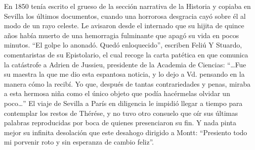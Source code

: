 \documentclass[10pt,twoside,openright]{memoir}
\begin{document}
En 1850 tenía escrito el grueso de la sección narrativa de la Historia y
copiaba en Sevilla los últimos documentos, cuando una horrorosa
desgracia cayó sobre él al modo de un rayo celeste. Le avisaron desde el
internado que su hijita de quince años había muerto de una hemorragia
fulminante que apagó su vida en pocos minutos. ``El golpe lo anonadó.
Quedó enloquecido'', escriben Feliú Y Stuardo, comentaristas de su
Epistolario, el cual recoge la carta patética en que comunica la
catástrofe a Adrien de Jussieu, presidente de la Academia de Ciencias:
``\ldots Fue su maestra la que me dio esta espantosa noticia, y lo dejo a
Vd. pensando en la manera cómo la recibí. Yo que, después de tantas
contrariedades y penas, miraba a esta hermosa niña como el único objeto
que podía hacérmelas olvidar un poco\ldots'' El viaje de Sevilla a París en
diligencia le impidió llegar a tiempo para contemplar los restos de
Thérése, y no tuvo otro consuelo que oír sus últimas palabras
reproducidas por boca de quienes presenciaron su fin. Y nada pinta mejor
su infinita desolación que este desahogo dirigido a Montt: ``Presiento
todo mi porvenir roto y sin esperanza de cambio feliz''.
\end{document}
